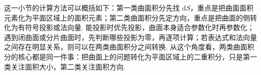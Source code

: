 \documentclass{ctexart}
\newenvironment{custom}[1]{\par\noindent \textbf{#1}\quad}{\par\vspace{1em}}
\begin{document}
这一小节的计算方法可以概括如下：第一类曲面积分先找 $\mathrm{d}S$，重点是把曲面面积元素化为平面区域上的面积元素；第二类曲面积分先定方向，重点是把曲面的侧转化为有符号投影或法向量. 能投影时优先投影，曲面本身适合参数化时再参数化；遇到闭曲面或分片曲面时，先判断哪些投影为零，再逐项计算；若表达式和法向量之间存在明显关系，则可以在两类曲面积分之间转换. 从这个角度看，两类曲面积分的核心都是同一件事：把曲面上的问题转化为平面区域上的二重积分，只是第一类关注面积大小，第二类关注面积方向.

\end{document}

